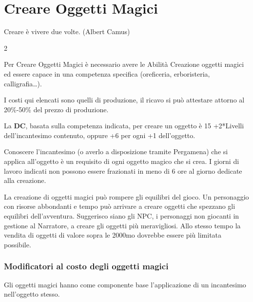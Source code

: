 \section{Creare Oggetti Magici}

\begin{enfasi}{
Creare è vivere due volte. (Albert Camus)
}\end{enfasi}

\begin{multicols}{2}

\label{creare-oggetti-magici}

Per Creare Oggetti Magici è necessario avere le Abilità Creazione oggetti magici ed essere capace in una competenza specifica (oreficeria, erboristeria, calligrafia…).

I costi qui elencati sono quelli di produzione, il ricavo si può attestare attorno al 20\%-50\% del prezzo di produzione.

La \textbf{DC}, basata sulla competenza indicata, per creare un oggetto è 15 +2*Livelli dell'incantesimo contenuto, oppure +6 per ogni +1 dell'oggetto.

Conoscere l'incantesimo (o averlo a disposizione tramite Pergamena) che si applica all'oggetto è un requisito di ogni oggetto magico che si crea. I giorni di lavoro indicati non possono essere frazionati in meno di 6 ore al giorno dedicate alla creazione.

\begin{narratore}
La creazione di oggetti magici può rompere gli equilibri del gioco. Un personaggio con risorse abbondanti e tempo può arrivare a creare oggetti che spezzano gli equilibri dell'avventura. Suggerisco siano gli NPC, i personaggi non giocanti in gestione al Narratore, a creare gli oggetti più meravigliosi. Allo stesso tempo la vendita di oggetti di valore sopra le 2000mo dovrebbe essere più limitata possibile.
\end{narratore}

\subsubsection{Modificatori al costo degli oggetti magici}\label{modificatoricostooggettimagici}

Gli oggetti magici hanno come componente base l'applicazione di un incantesimo nell'oggetto stesso.


\end{multicols}
